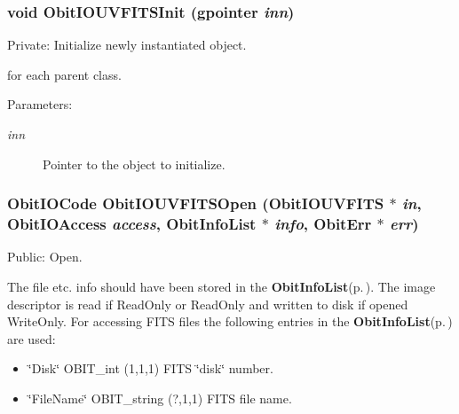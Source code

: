 \subsubsection{\setlength{\rightskip}{0pt plus 5cm}void Obit\-IOUVFITSInit (gpointer {\em inn})}\label{ObitIOUVFITS_8c_a3}


Private: Initialize newly instantiated object. 

for each parent class. \begin{Desc}
\item[Parameters:]
\begin{description}
\item[{\em inn}]Pointer to the object to initialize. \end{description}
\end{Desc}
\subsubsection{\setlength{\rightskip}{0pt plus 5cm}Obit\-IOCode Obit\-IOUVFITSOpen ({\bf Obit\-IOUVFITS} $\ast$ {\em in}, Obit\-IOAccess {\em access}, {\bf Obit\-Info\-List} $\ast$ {\em info}, {\bf Obit\-Err} $\ast$ {\em err})}\label{ObitIOUVFITS_8c_a24}


Public: Open. 

The file etc. info should have been stored in the {\bf Obit\-Info\-List}{\rm (p.\,\pageref{structObitInfoList})}. The image descriptor is read if Read\-Only or Read\-Only and written to disk if opened Write\-Only. For accessing FITS files the following entries in the {\bf Obit\-Info\-List}{\rm (p.\,\pageref{structObitInfoList})} are used: \begin{itemize}
\item \char`\"{}Disk\char`\"{} OBIT\_\-int (1,1,1) FITS \char`\"{}disk\char`\"{} number. \item \char`\"{}File\-Name\char`\"{} OBIT\_\-string (?,1,1) FITS file name. 
\end{itemize}
